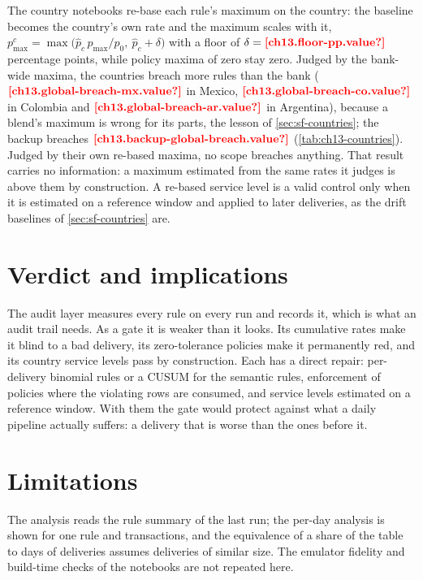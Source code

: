 The country notebooks re-base each rule's maximum on the country: the baseline becomes the country's own rate and the
maximum scales with it, $p^{c}_{\max} = \max\bigl(\hat p_c\, p_{\max} / p_0,\ \hat p_c + \delta\bigr)$ with a floor of
$\delta = \est{ch13.floor-pp}{value}$ percentage points, while policy maxima of zero stay zero. Judged by the bank-wide
maxima, the countries breach more rules than the bank ($\est{ch13.global-breach-mx}{value}$ in Mexico,
$\est{ch13.global-breach-co}{value}$ in Colombia and $\est{ch13.global-breach-ar}{value}$ in Argentina), because a blend's
maximum is wrong for its parts, the lesson of \cref{sec:sf-countries}; the backup breaches $\est{ch13.backup-global-breach}{value}$
(\cref{tab:ch13-countries}). Judged by their own re-based maxima, no scope breaches anything. That result carries no
information: a maximum estimated from the same rates it judges is above them by construction. A re-based service level is a
valid control only when it is estimated on a reference window and applied to later deliveries, as the drift baselines of
\cref{sec:sf-countries} are.



\section{Verdict and implications}\label{sec:ag-verdict}

The audit layer measures every rule on every run and records it, which is what an audit trail needs. As a gate it is
weaker than it looks. Its cumulative rates make it blind to a bad delivery, its zero-tolerance policies make it permanently
red, and its country service levels pass by construction. Each has a direct repair: per-delivery binomial rules or a CUSUM
for the semantic rules, enforcement of policies where the violating rows are consumed, and service levels estimated on a
reference window. With them the gate would protect against what a daily pipeline actually suffers: a delivery that is
worse than the ones before it.

\section{Limitations}\label{sec:ag-limits}

The analysis reads the rule summary of the last run; the per-day analysis is shown for one rule and transactions, and the
equivalence of a share of the table to days of deliveries assumes deliveries of similar size. The emulator fidelity and
build-time checks of the notebooks are not repeated here.
